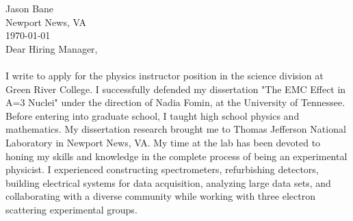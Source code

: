 \documentclass[12pt,letterpaper]{article}
\begin{document}
\vspace*{-1.2cm}
\noindent Jason Bane\\
Newport News, VA \\
\today\\

Dear Hiring Manager,

\paragraph{}I write to apply for the physics instructor position in the science division at Green River College. I successfully defended my dissertation "The EMC Effect in A=3 Nuclei" under the direction of Nadia Fomin, at the University of Tennessee. Before entering into graduate school, I taught high school physics and mathematics. My dissertation research brought me to Thomas Jefferson National Laboratory in Newport News, VA. My time at the lab has been devoted to honing my skills and knowledge in the complete process of being an experimental physicist. I experienced constructing spectrometers, refurbishing detectors, building electrical systems for data acquisition, analyzing large data sets, and collaborating with a diverse community while working with three electron scattering experimental groups.
\end{document}
